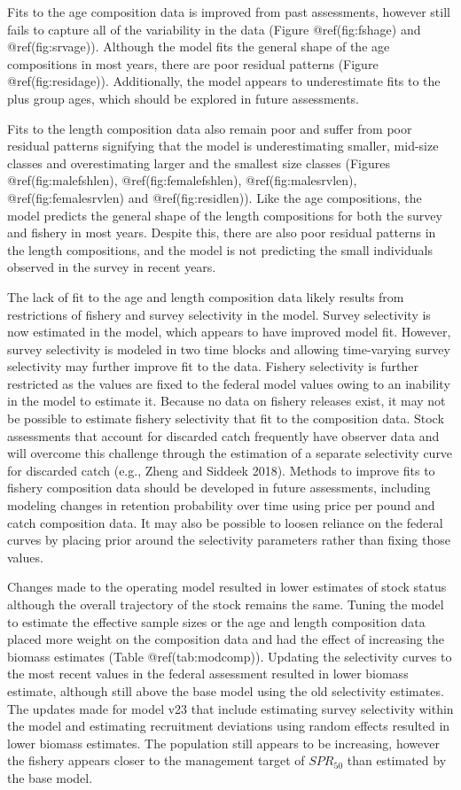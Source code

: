 \documentclass[
]{article}
\begin{document}
Fits to the age composition data is improved from past assessments,
however still fails to capture all of the variability in the data
(Figure @ref(fig:fshage) and @ref(fig:srvage)). Although the model fits
the general shape of the age compositions in most years, there are poor
residual patterns (Figure @ref(fig:residage)). Additionally, the model
appears to underestimate fits to the plus group ages, which should be
explored in future assessments.

Fits to the length composition data also remain poor and suffer from
poor residual patterns signifying that the model is underestimating
smaller, mid-size classes and overestimating larger and the smallest
size classes (Figures @ref(fig:malefshlen), @ref(fig:femalefshlen),
@ref(fig:malesrvlen), @ref(fig:femalesrvlen) and @ref(fig:residlen)).
Like the age compositions, the model predicts the general shape of the
length compositions for both the survey and fishery in most years.
Despite this, there are also poor residual patterns in the length
compositions, and the model is not predicting the small individuals
observed in the survey in recent years.

The lack of fit to the age and length composition data likely results
from restrictions of fishery and survey selectivity in the model. Survey
selectivity is now estimated in the model, which appears to have
improved model fit. However, survey selectivity is modeled in two time
blocks and allowing time-varying survey selectivity may further improve
fit to the data. Fishery selectivity is further restricted as the values
are fixed to the federal model values owing to an inability in the model
to estimate it. Because no data on fishery releases exist, it may not be
possible to estimate fishery selectivity that fit to the composition
data. Stock assessments that account for discarded catch frequently have
observer data and will overcome this challenge through the estimation of
a separate selectivity curve for discarded catch (e.g., Zheng and
Siddeek 2018). Methods to improve fits to fishery composition data
should be developed in future assessments, including modeling changes in
retention probability over time using price per pound and catch
composition data. It may also be possible to loosen reliance on the
federal curves by placing prior around the selectivity parameters rather
than fixing those values.

Changes made to the operating model resulted in lower estimates of stock
status although the overall trajectory of the stock remains the same.
Tuning the model to estimate the effective sample sizes or the age and
length composition data placed more weight on the composition data and
had the effect of increasing the biomass estimates (Table
@ref(tab:modcomp)). Updating the selectivity curves to the most recent
values in the federal assessment resulted in lower biomass estimate,
although still above the base model using the old selectivity estimates.
The updates made for model v23 that include estimating survey
selectivity within the model and estimating recruitment deviations using
random effects resulted in lower biomass estimates. The population still
appears to be increasing, however the fishery appears closer to the
management target of \(SPR_{50}\) than estimated by the base model.
\end{document}
